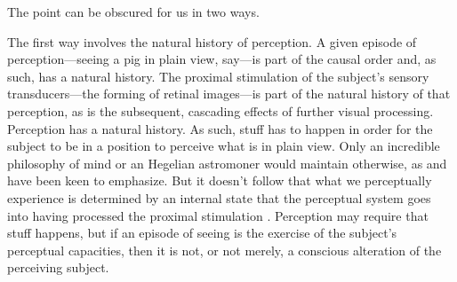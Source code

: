 \documentclass[12pt]{article}
\begin{document}
The point can be obscured for us in two ways.

The first way involves the natural history of perception. A given episode of perception---seeing a pig in plain view, say---is part of the causal order and, as such, has a natural history. The proximal stimulation of the subject's sensory transducers---the forming of retinal images---is part of the natural history of that perception, as is the subsequent, cascading effects of further visual processing. Perception has a natural history. As such, stuff has to happen in order for the subject to be in a position to perceive what is in plain view. Only an incredible philosophy of mind or an Hegelian astromoner would maintain otherwise, as \citet{Burnyeat:1992fk} and \citet{Burge:2005uq} have been keen to emphasize. But it doesn't follow that what we perceptually experience is determined by an internal state that the perceptual system goes into having processed the proximal stimulation \citep[see][]{Campbell:2010uq,McDowell:2010fk,Travis:2011os}. Perception may require that stuff happens, but if an episode of seeing is the exercise of the subject's perceptual capacities, then it is not, or not merely, a conscious alteration of the perceiving subject.
\end{document}
